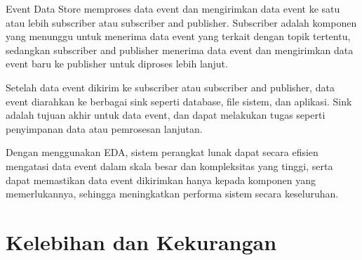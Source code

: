 Event Data Store memproses data event dan mengirimkan data event ke satu atau lebih subscriber atau subscriber and publisher. Subscriber adalah komponen yang menunggu untuk menerima data event yang terkait dengan topik tertentu, sedangkan subscriber and publisher menerima data event dan mengirimkan data event baru ke publisher untuk diproses lebih lanjut.

Setelah data event dikirim ke subscriber atau subscriber and publisher, data event diarahkan ke berbagai sink seperti database, file sistem, dan aplikasi. Sink adalah tujuan akhir untuk data event, dan dapat melakukan tugas seperti penyimpanan data atau pemrosesan lanjutan.

Dengan menggunakan EDA, sistem perangkat lunak dapat secara efisien mengatasi data event dalam skala besar dan kompleksitas yang tinggi, serta dapat memastikan data event dikirimkan hanya kepada komponen yang memerlukannya, sehingga meningkatkan performa sistem secara keseluruhan.


\section{Kelebihan dan Kekurangan}
